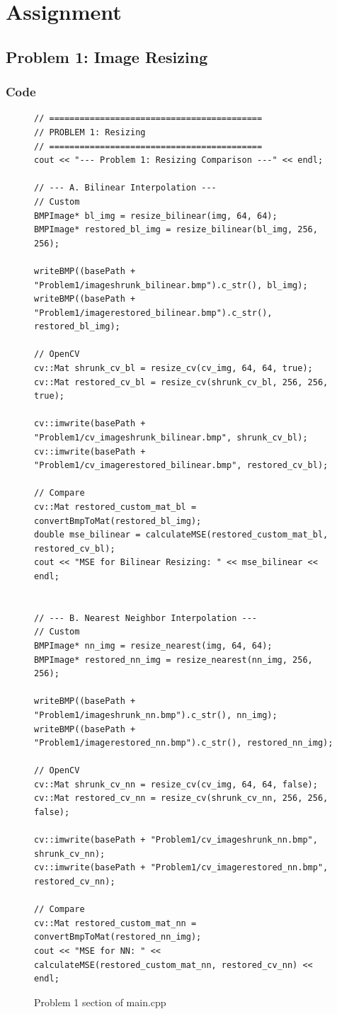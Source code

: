 \documentclass[11pt]{article}
\begin{document}
\section{Assignment}


\subsection{Problem 1: Image Resizing}
\subsubsection{Code}

\begin{figure}[H]
\begin{verbatim}
// ==========================================
// PROBLEM 1: Resizing
// ==========================================
cout << "--- Problem 1: Resizing Comparison ---" << endl;

// --- A. Bilinear Interpolation ---
// Custom
BMPImage* bl_img = resize_bilinear(img, 64, 64);
BMPImage* restored_bl_img = resize_bilinear(bl_img, 256, 256);

writeBMP((basePath + "Problem1/imageshrunk_bilinear.bmp").c_str(), bl_img);    
writeBMP((basePath + "Problem1/imagerestored_bilinear.bmp").c_str(), restored_bl_img);

// OpenCV
cv::Mat shrunk_cv_bl = resize_cv(cv_img, 64, 64, true);
cv::Mat restored_cv_bl = resize_cv(shrunk_cv_bl, 256, 256, true);

cv::imwrite(basePath + "Problem1/cv_imageshrunk_bilinear.bmp", shrunk_cv_bl);
cv::imwrite(basePath + "Problem1/cv_imagerestored_bilinear.bmp", restored_cv_bl);

// Compare
cv::Mat restored_custom_mat_bl = convertBmpToMat(restored_bl_img);
double mse_bilinear = calculateMSE(restored_custom_mat_bl, restored_cv_bl);
cout << "MSE for Bilinear Resizing: " << mse_bilinear << endl;


// --- B. Nearest Neighbor Interpolation ---
// Custom
BMPImage* nn_img = resize_nearest(img, 64, 64);    
BMPImage* restored_nn_img = resize_nearest(nn_img, 256, 256);

writeBMP((basePath + "Problem1/imageshrunk_nn.bmp").c_str(), nn_img); 
writeBMP((basePath + "Problem1/imagerestored_nn.bmp").c_str(), restored_nn_img);

// OpenCV
cv::Mat shrunk_cv_nn = resize_cv(cv_img, 64, 64, false);
cv::Mat restored_cv_nn = resize_cv(shrunk_cv_nn, 256, 256, false);

cv::imwrite(basePath + "Problem1/cv_imageshrunk_nn.bmp", shrunk_cv_nn);
cv::imwrite(basePath + "Problem1/cv_imagerestored_nn.bmp", restored_cv_nn);

// Compare
cv::Mat restored_custom_mat_nn = convertBmpToMat(restored_nn_img);
cout << "MSE for NN: " << calculateMSE(restored_custom_mat_nn, restored_cv_nn) << endl;

\end{verbatim}

\caption{Problem 1 section of main.cpp}
\label{figure:Problem1}
\end{figure}
\end{document}
